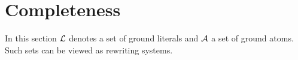 %
%
%
\section{Completeness} \label{se:completeness} 
%
In this section $\mbox {$\cal L$}$ denotes a set of ground literals and $\mbox {$\cal A$}$ a set of
ground atoms.  Such sets can be viewed as rewriting systems.

